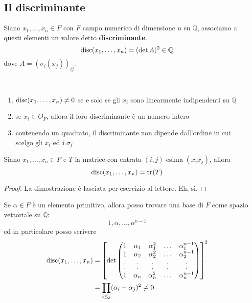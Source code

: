 \subsection{Il discriminante}
\begin{definizione}[Discriminante]
	Siano $x_1,\dots,x_n\in F$ con $F$ campo numerico di dimensione $n$ su $\mathbb{Q}$, associamo a questi elementi un valore detto \textbf{discriminante}.
	\begin{equation*}
	\operatorname{disc}(x_1,\dots,x_n)=(\det A)^2\in\mathbb{Q}
	\end{equation*}
	dove $A=\left(\sigma_i(x_j)\right)_{ij}$.
\end{definizione}
\begin{proposizione}\
	\begin{enumerate}
		\item $\operatorname{disc}(x_1,\dots,x_n)\neq0$ se e solo se gli $x_i$ sono linearmente indipendenti su $\mathbb{Q}$
		\item se $x_i\in O_F$, allora il loro discriminante è un numero intero
		\item contenendo un quadrato, il discriminante non dipende dall'ordine in cui scelgo gli $x_i$ ed i $\sigma_j$
	\end{enumerate}
\end{proposizione}
\begin{proposizione}
	Siano $x_1,\dots,x_n\in F$ e $T$ la matrice con entrata $(i,j)$-esima $(x_ix_j)$, allora
	\begin{equation*}
	\operatorname{disc}(x_1,\dots,x_n)=\operatorname{tr}(T)
	\end{equation*}
\end{proposizione}
\begin{proof}
	La dimostrazione è lasciata per esercizio al lettore. Eh, sì.
\end{proof}
\begin{osservazione}
	Se $\alpha\in F$ è un elemento primitivo, allora posso trovare una base di $F$ come spazio vettoriale su $\mathbb{Q}$:
	\begin{equation*}
	1,\alpha,\dots,\alpha^{n-1}
	\end{equation*}
	ed in particolare posso scrivere
	\begin{align*}
	\operatorname{disc}(x_1,\dots,x_n)
	&=\left[\det
	\begin{pmatrix}
	1 & \alpha_1 & \alpha_1^2 & \dots & \alpha_1^{n-1}\\
	1 & \alpha_2 & \alpha_2^2 & \dots & \alpha_2^{n-1}\\
	\vdots&\vdots&\vdots&\vdots&\vdots\\
	1 & \alpha_n & \alpha_n^2 & \dots & \alpha_n^{n-1}
	\end{pmatrix}
	\right]^2\\
	&=\prod_{i\leq j}(\alpha_i-\alpha_j)^2\neq0
	\end{align*}
\end{osservazione}
